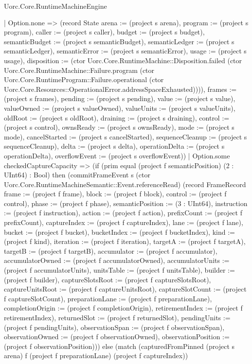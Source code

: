 \begin{lexlean}{Uorc.Core.RuntimeMachineEngine}
\begin{semanticmodule}
{        | Option.none => (record State {arena := (project s arena), program := (project s program), caller := (project s caller), budget := (project s budget), semanticBudget := (project s semanticBudget), semanticLedger := (project s semanticLedger), semanticError := (project s semanticError), usage := (project s usage), disposition := (ctor Uorc.Core.RuntimeMachine::Disposition.failed (ctor Uorc.Core.RuntimeMachine::Failure.program (ctor Uorc.Core.RuntimeProgram::Failure.operational (ctor Uorc.Core.Resources::OperationalError.addressSpaceExhausted)))), frames := (project s frames), pending := (project s pending), value := (project s value), valueOwned := (project s valueOwned), valueUnits := (project s valueUnits), oldRoot := (project s oldRoot), draining := (project s draining), control := (project s control), ownsReady := (project s ownsReady), mode := (project s mode), cancelStarted := (project s cancelStarted), sequenceCleanup := (project s sequenceCleanup), delta := (project s delta), operationDelta := (project s operationDelta), overflowEvent := (project s overflowEvent)})
        | Option.some checkedCaptureCapacity => (if (prim equal (project f semanticPosition) (2 : UInt64) : Bool) then (commitFrameEvent s (ctor Uorc.Core.RuntimeMachineSemantic::Event.referenceRead) (record FrameRecord {frame := (project f frame), block := (project f block), control := (project f control), phase := (project f phase), semanticPosition := (3 : UInt64), instruction := (project f instruction), action := (project f action), prefixCount := (project f prefixCount), captureIndex := (project f captureIndex), lane := (project f lane), bucket := (project f bucket), bucketIndex := (project f bucketIndex), kind := (project f kind), iteration := (project f iteration), targetA := (project f targetA), targetB := (project f targetB), accumulator := (project f accumulator), accumulatorOwned := (project f accumulatorOwned), accumulatorUnits := (project f accumulatorUnits), unitsTable := (project f unitsTable), builder := (project f builder), captureSlotsRoot := (project f captureSlotsRoot), captureUnitsRoot := (project f captureUnitsRoot), captureSlotCount := (project f captureSlotCount), preparationLane := (project f preparationLane), completionOrigin := (project f completionOrigin), retirementIndex := (project f retirementIndex), returnedSlot := (project f returnedSlot), pendingUnits := (project f pendingUnits), observationSpan := (project f observationSpan), observationOwned := (project f observationOwned), observationPosition := (project f observationPosition)})) else (match (capturedFromPinned (project s arena) f (project f preparationLane) (project f captureIndex))
}
\end{semanticmodule}
\end{lexlean}

